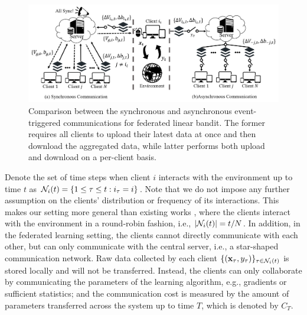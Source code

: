 \begin{figure}[t]
\centering
\includegraphics[width=14cm]{imgs/sync_vs_async.png}
\caption{Comparison between the synchronous and asynchronous event-triggered communications for federated linear bandit. The former requires all clients to upload their latest data at once and then download the aggregated data, while latter performs both upload and download on a per-client basis.}
\label{fig:algo}
\end{figure}

Denote the set of time steps when client $i$ interacts with the environment up to time $t$ as $\mathcal{N}_{i}(t)=\left\{1 \leq \tau \leq t:i_{\tau}=i\right\}$. Note that we do not impose any further assumption on the clients' distribution or frequency of its interactions. This makes our setting more general than existing works \citep{wang2019distributed,dubey2020differentially}, where the clients interact with the environment in a round-robin fashion, i.e., $|\mathcal{N}_{i}(t)|=t/N$. 
In addition, in the federated learning setting, the clients cannot directly communicate with each other, but can only communicate with the central server, i.e., a star-shaped communication network. Raw data collected by each client $\{(\mathbf{x}_{\tau},y_{\tau})\}_{\tau \in \mathcal{N}_{i}(t)}$ is stored locally and will not be transferred. Instead, the clients can only collaborate by communicating the parameters of the learning algorithm, e.g., gradients or sufficient statistics; and the communication cost is measured by the amount of parameters transferred across the system up to time $T$, which is denoted by $C_{T}$.

